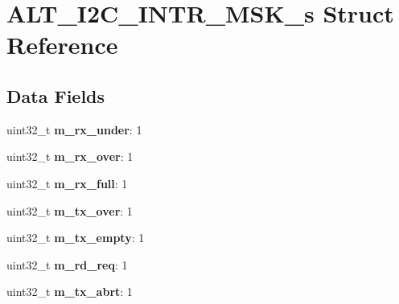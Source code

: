 \hypertarget{structALT__I2C__INTR__MSK__s}{}\section{A\+L\+T\+\_\+\+I2\+C\+\_\+\+I\+N\+T\+R\+\_\+\+M\+S\+K\+\_\+s Struct Reference}
\label{structALT__I2C__INTR__MSK__s}
\subsection*{Data Fields}
\begin{DoxyCompactItemize}
\item 
\mbox{\label{structALT__I2C__INTR__MSK__s_a07638b0ec5f2f6fa20096ed74433ea99}} 
uint32\+\_\+t {\bfseries m\+\_\+rx\+\_\+under}\+: 1
\item 
\mbox{\label{structALT__I2C__INTR__MSK__s_aebcb31457b332c222f911e952bd4d246}} 
uint32\+\_\+t {\bfseries m\+\_\+rx\+\_\+over}\+: 1
\item 
\mbox{\label{structALT__I2C__INTR__MSK__s_a2734acdf91fbea4cb8e578bc978c2fac}} 
uint32\+\_\+t {\bfseries m\+\_\+rx\+\_\+full}\+: 1
\item 
\mbox{\label{structALT__I2C__INTR__MSK__s_acd2678bd36f8fdde61c6d815bfb5c81b}} 
uint32\+\_\+t {\bfseries m\+\_\+tx\+\_\+over}\+: 1
\item 
\mbox{\label{structALT__I2C__INTR__MSK__s_a2d85efb62d4b875c0d847fc35a45e687}} 
uint32\+\_\+t {\bfseries m\+\_\+tx\+\_\+empty}\+: 1
\item 
\mbox{\label{structALT__I2C__INTR__MSK__s_a9f0193b2221ee5e8afcda17170b8b42a}} 
uint32\+\_\+t {\bfseries m\+\_\+rd\+\_\+req}\+: 1
\item 
\mbox{\label{structALT__I2C__INTR__MSK__s_a8f7ddead8ce7a404954d43109ae4bf09}} 
uint32\+\_\+t {\bfseries m\+\_\+tx\+\_\+abrt}\+: 1
\item 
\mbox{\label{structALT__I2C__INTR__MSK__s_a43a2f71f217acdc557a037fc64da44eb}} 

\end{DoxyCompactItemize}
